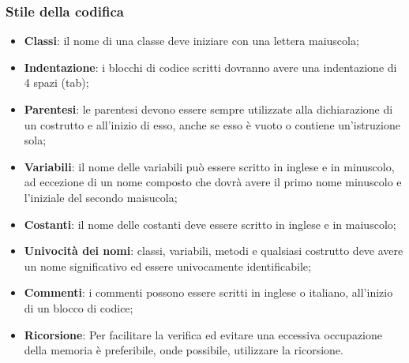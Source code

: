 \subsubsection{Stile della codifica}
\begin{itemize}
	\item \textbf{Classi}: il nome di una classe deve iniziare con una lettera maiuscola;
	\item \textbf{Indentazione}: i blocchi di codice scritti dovranno avere una indentazione di 4 spazi (tab);
	\item \textbf{Parentesi}: le parentesi devono essere sempre utilizzate alla dichiarazione di un costrutto e all'inizio di esso, anche se esso è vuoto o contiene un'istruzione sola;
	\item \textbf{Variabili}: il nome delle variabili può essere scritto in inglese e in minuscolo, ad eccezione di un nome composto che dovrà avere il primo nome minuscolo e l'iniziale del secondo maisucola;
	\item \textbf{Costanti}: il nome delle costanti deve essere scritto in inglese e in maiuscolo;
	\item \textbf{Univocità dei nomi}: classi, variabili, metodi e qualsiasi costrutto deve avere un nome significativo ed essere univocamente identificabile; 
	\item \textbf{Commenti}: i commenti possono essere scritti in inglese o italiano, all'inizio di un blocco di codice;
	\item \textbf{Ricorsione}: Per facilitare la verifica ed evitare una eccessiva occupazione della memoria è preferibile, onde possibile, utilizzare la ricorsione.
\end{itemize}

